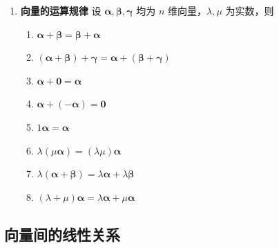 \documentclass[UTF8]{ctexart}
\theoremstyle{mydef}
\begin{document}
\begin{enumerate}
    \item \textbf{向量的运算规律}
    设 $\boldsymbol{\alpha}, \boldsymbol{\beta}, \boldsymbol{\gamma}$ 均为 $n$ 维向量，$\lambda, \mu$ 为实数，则
    \begin{enumerate}
        \item $\boldsymbol{\alpha} + \boldsymbol{\beta} = \boldsymbol{\beta} + \boldsymbol{\alpha}$
        \item $(\boldsymbol{\alpha} + \boldsymbol{\beta}) + \boldsymbol{\gamma} = \boldsymbol{\alpha} + (\boldsymbol{\beta} + \boldsymbol{\gamma})$
        \item $\boldsymbol{\alpha} + \boldsymbol{0} = \boldsymbol{\alpha}$
        \item $\boldsymbol{\alpha} + (-\boldsymbol{\alpha}) = \boldsymbol{0}$
        \item $1\boldsymbol{\alpha} = \boldsymbol{\alpha}$
        \item $\lambda(\mu\boldsymbol{\alpha}) = (\lambda\mu)\boldsymbol{\alpha}$
        \item $\lambda(\boldsymbol{\alpha} + \boldsymbol{\beta}) = \lambda\boldsymbol{\alpha} + \lambda\boldsymbol{\beta}$
        \item $(\lambda + \mu)\boldsymbol{\alpha} = \lambda\boldsymbol{\alpha} + \mu\boldsymbol{\alpha}$
    \end{enumerate}
\end{enumerate}

\subsection{向量间的线性关系}
\end{document}
